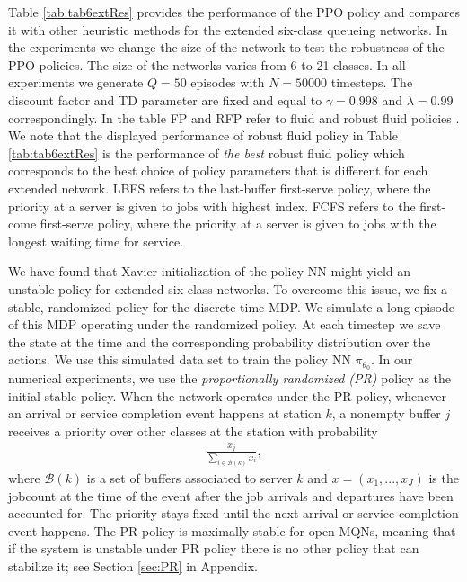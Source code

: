 \documentclass[11pt]{article}
\newcommand{\B}{\mathcal{B}}
\theoremstyle{definition}
\numberwithin{equation}{section}
\begin{document}
 Table \ref{tab:tab6extRes} provides the performance of the PPO policy and compares it with other heuristic methods for the extended six-class queueing networks. In the experiments we change the size of the network to test the robustness of the PPO policies. The size of the networks varies from 6 to 21 classes. In all experiments we generate $Q=50$ episodes with $N=50000$ timesteps. The discount factor and TD parameter are fixed and equal to $\gamma=0.998$ and $\lambda = 0.99$ correspondingly.
In the table FP and RFP refer to fluid and robust fluid policies \cite{Bertsimas2015}.  We note that the displayed  performance of robust fluid policy in Table \ref{tab:tab6extRes} is the performance of \textit{the best}  robust fluid policy which corresponds to the best choice of policy parameters that is different for each extended network.
LBFS refers to the last-buffer first-serve policy,
where the priority at a server is given to jobs with highest index.  FCFS refers to the first-come first-serve policy, where the priority at a server is given to jobs with the longest waiting time for service.


We have found that Xavier initialization of the policy NN might yield
an unstable policy for extended six-class networks. To overcome this
issue, we fix a stable, randomized policy  for the discrete-time MDP.  We simulate a long episode
of this MDP operating under the randomized policy. At each timestep we save the state at the time
and the corresponding probability distribution over the actions.
We use this simulated data set to train the
policy NN $\pi_{\theta_0}$.
 In our numerical experiments, we use the \textit{ proportionally  randomized (PR)}  policy as the initial stable policy.
When the network operates under the PR policy,
whenever an arrival or service completion event happens at station $k$, a nonempty buffer $j$ receives a
priority over other classes at the station with
probability
\begin{align}\label{eq:PRPprob}
\frac{x_j}{\sum\limits_{i\in \B(k)}  x_i},
\end{align}
 where  $\B(k)$ is a set of buffers associated to server $k$ and $x = (x_1, ..., x_J)$ is the jobcount at the time of the event  after the job arrivals and departures have been accounted for.
  The priority  stays fixed   until the next arrival or service completion event happens.
  The PR policy is  maximally stable for open MQNs, meaning that if the system is unstable under PR policy there is no other policy that can stabilize it; see Section \ref{sec:PR} in Appendix.
\end{document}
